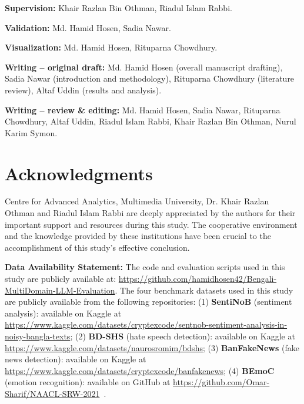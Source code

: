 \documentclass[10pt,letterpaper]{article}
\begin{document}
\textbf{Supervision:} Khair Razlan Bin Othman, Riadul Islam Rabbi.

\textbf{Validation:} Md. Hamid Hosen, Sadia Nawar.

\textbf{Visualization:} Md. Hamid Hosen, Rituparna Chowdhury.

\textbf{Writing – original draft:}  
Md. Hamid Hosen (overall manuscript drafting),  
Sadia Nawar (introduction and methodology),  
Rituparna Chowdhury (literature review),  
Altaf Uddin (results and analysis).

\textbf{Writing – review \& editing:}  
Md. Hamid Hosen, Sadia Nawar, Rituparna Chowdhury, Altaf Uddin,  
Riadul Islam Rabbi, Khair Razlan Bin Othman, Nurul Karim Symon.




\section*{Acknowledgments}
 Centre for Advanced Analytics, Multimedia University, Dr. Khair Razlan Othman and Riadul Islam Rabbi are deeply appreciated by the authors for their important support and resources during this study. The cooperative environment and the knowledge provided by these institutions have been crucial to the accomplishment of this study's effective conclusion.

\noindent \textbf{Data Availability Statement:} 
The code and evaluation scripts used in this study are publicly available at: \url{https://github.com/hamidhosen42/Bengali-MultiDomain-LLM-Evaluation}. The four benchmark datasets used in this study are publicly available from the following repositories: (1) \textbf{SentiNoB} (sentiment analysis): available on Kaggle at \url{https://www.kaggle.com/datasets/cryptexcode/sentnob-sentiment-analysis-in-noisy-bangla-texts}; (2) \textbf{BD-SHS} (hate speech detection): available on Kaggle at \url{https://www.kaggle.com/datasets/naurosromim/bdshs}; (3) \textbf{BanFakeNews} (fake news detection): available on Kaggle at \url{https://www.kaggle.com/datasets/cryptexcode/banfakenews}; (4) \textbf{BEmoC} (emotion recognition): available on GitHub at \url{https://github.com/Omar-Sharif/NAACL-SRW-2021}~\cite{b32}.

\nolinenumbers

%
%


\end{document}
